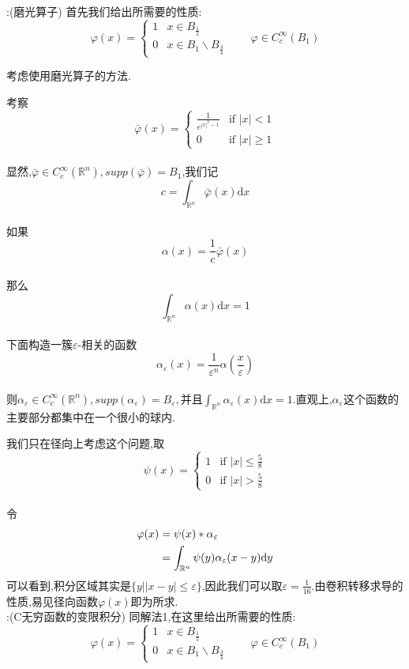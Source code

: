 \documentclass[12pt, a4paper]{ctexbook}
\newcommand{\dx}{\text{d}x}
\newcommand{\dy}{\text{d}y}
\begin{document}
    \songti{}:(磨光算子)
    首先我们给出所需要的性质:$$
    \varphi(x)=\begin{cases}
    1 &  x\in B_{\frac{1}{2}}\\
    0 &  x \in B_1 \backslash B_{\frac{3}{4}}
    \end{cases} \qquad \varphi \in C_{c}^{\infty}(B_1)$$
    
    考虑使用磨光算子的方法.
    
    考察$$
    \bar{\varphi}(x)=    \begin{cases}
    \frac{1}{e^{|x|^2-1}} & \text{if } |x|<1\\
    0 & \text{if }  |x| \ge 1
    \end{cases}$$ \\
    显然,$\bar{\varphi} \in C_{c}^{\infty}(\mathbb{R}^n),supp(\bar{\varphi})=B_1$,我们记$$
    c=\int_{\mathbb{R}^n} \bar{\varphi}(x)\dx $$\\
    如果$$
    \alpha(x)=\frac{1}{c}\bar{\varphi}(x) $$\\
    那么$$
    \int_{\mathbb{R}^n} \alpha(x)\dx=1 $$\\
    下面构造一簇$\varepsilon$-相关的函数$$
    \alpha_{\varepsilon}(x)=\frac{1}{\varepsilon^n}\alpha\left(\frac{x}{\varepsilon}\right) $$\\
    则$\alpha_{\varepsilon} \in C_{c}^{\infty}(\mathbb{R}^n),supp(\alpha_{\varepsilon})=B_{\varepsilon},\text{并且}\int_{\mathbb{R}^n} \alpha_{\varepsilon}(x)\dx=1$.直观上,$\alpha_{\varepsilon}$这个函数的主要部分都集中在一个很小的球内.
    
    我们只在径向上考虑这个问题,取$$
    \psi(x)=    \begin{cases}
    1 & \text{if } |x|\le \frac{5}{8}\\
    0 & \text{if }  |x| > \frac{5}{8}
    \end{cases}$$ \\
    令
    \begin{align}
    \varphi(x)&=\psi(x)\ast \alpha_{\varepsilon} \notag \\
    &= \int_{\mathbb{R}^n} \psi(y) \alpha_{\varepsilon}(x-y) \dy  \notag
    \end{align}
    可以看到,积分区域其实是$\{ \left. y\right| |x-y| \le \varepsilon \} $,因此我们可以取$\varepsilon=\frac{1}{16}$.由卷积转移求导的性质,易见径向函数$\varphi(x)$即为所求.
    \\
    
    \songti{}:(C无穷函数的变限积分)
    同解法1,在这里给出所需要的性质:$$
    \varphi(x)=\begin{cases}
    1 &  x\in B_{\frac{1}{2}}\\
    0 &  x \in B_1 \backslash B_{\frac{3}{4}}
    \end{cases}    \qquad \varphi \in C_{c}^{\infty}(B_1)$$
    
\end{document}

